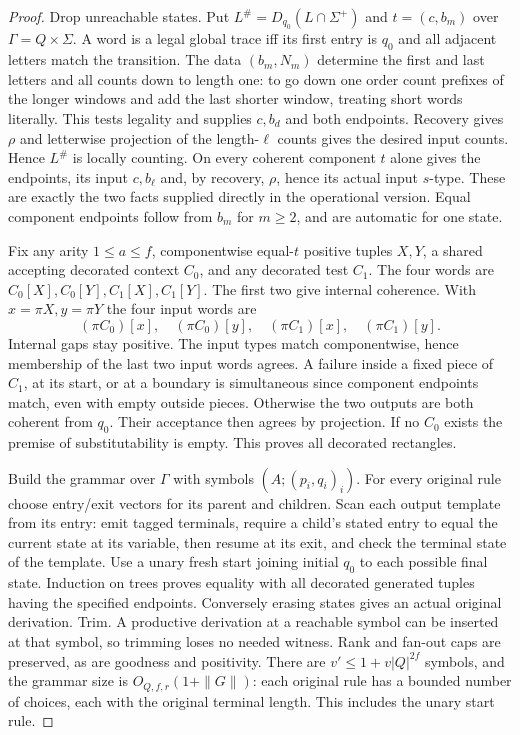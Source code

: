 \documentclass[11pt]{article}
\begin{document}
\begin{proof}
Drop unreachable states. Put $L^\#=D_{q_0}(L\cap\Sigma^+)$ and
$t=(c,b_m)$ over $\Gamma=Q\times\Sigma$. A word is a legal global trace
iff its first entry is $q_0$ and all adjacent letters match the transition.
The data $(b_m,N_m)$ determine the first and last letters and all counts
down to length one: to go down one order count prefixes of the longer
windows and add the last shorter window, treating short words literally.
This tests legality and supplies $c,b_d$ and both endpoints.
Recovery gives $\rho$ and letterwise projection of the length-$\ell$ counts
gives the desired input counts. Hence $L^\#$ is locally counting.
On every coherent component $t$ alone gives the endpoints, its input
$c,b_\ell$ and, by recovery, $\rho$, hence its actual input $s$-type. These are exactly the two facts supplied
directly in the operational version. Equal component endpoints follow from
$b_m$ for $m\ge2$, and are automatic for one state.

Fix any arity $1\le a\le f$, componentwise equal-$t$ positive tuples $X,Y$,
a shared accepting decorated context $C_0$, and any decorated test $C_1$.
The four words are $C_0[X],C_0[Y],C_1[X],C_1[Y]$. The first two give
internal coherence. With $x=\pi X,y=\pi Y$ the four input words are
\[ (\pi C_0)[x],\quad(\pi C_0)[y],\quad(\pi C_1)[x],\quad(\pi C_1)[y]. \]
Internal gaps stay positive. The input types match componentwise, hence
membership of the last two input words agrees. A failure inside a fixed
piece of $C_1$, at its start, or at a boundary is simultaneous since
component endpoints match, even with empty outside pieces. Otherwise the
two outputs are both coherent from $q_0$. Their acceptance then agrees
by projection. If no $C_0$ exists the premise of substitutability is empty.
This proves all decorated rectangles.

Build the grammar over $\Gamma$ with symbols $(A;(p_i,q_i)_i)$.
For every original rule choose entry/exit vectors for its parent and
children. Scan each output template from its entry: emit tagged terminals,
require a child's stated entry to equal the current state at its variable,
then resume at its exit, and check the terminal state of the template.
Use a unary fresh start joining initial $q_0$ to each possible final state.
Induction on trees proves equality with all decorated generated tuples
having the specified endpoints. Conversely erasing states gives an actual
original derivation. Trim. A productive derivation at a reachable symbol
can be inserted at that symbol, so trimming loses no needed witness.
Rank and fan-out caps are preserved, as are goodness and positivity.
There are $v'\le1+v|Q|^{2f}$ symbols, and the grammar size is
$O_{Q,f,r}(1+\|G\|)$: each original rule has a bounded number of choices,
each with the original terminal length. This includes the unary start rule.


\end{proof}
\end{document}
